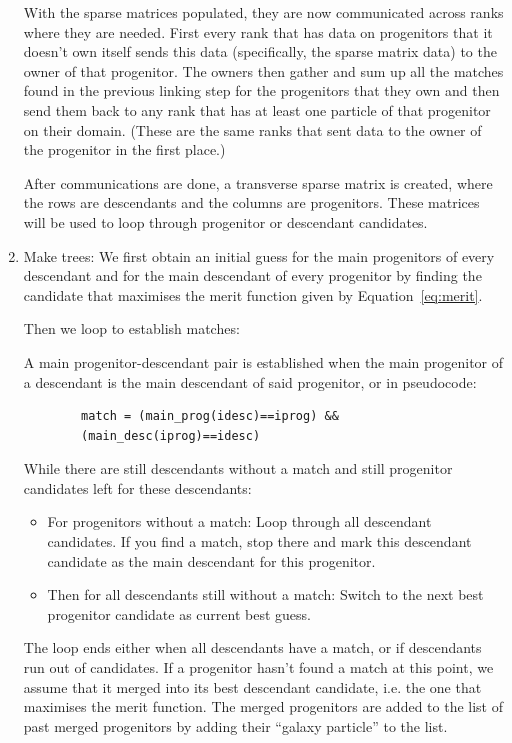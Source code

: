\begin{enumerate}
		With the sparse matrices populated, they are now communicated across ranks where they are needed. 
		First every rank that has data on progenitors that it doesn't own itself sends this data (specifically, the sparse matrix data) to the owner of that progenitor.
		The owners then gather and sum up all the matches found in the previous linking step for the progenitors that they own and then send them 
		back to any rank that has at least one particle of that progenitor on their domain.
		(These are the same ranks that sent data to the owner of the progenitor in the first place.)
		
		After communications are done, a transverse sparse matrix is created, where the rows are descendants and the columns are progenitors.
		These matrices will be used to loop through progenitor or descendant candidates.
		

	
	\item Make trees:
		We first obtain an initial guess for the main progenitors of every descendant and for the main descendant of every progenitor by
		finding the candidate that maximises the merit function given by Equation~\eqref{eq:merit}.
		
		Then we loop to establish matches:
		
		A main progenitor-descendant pair is established when the main progenitor of a descendant is the main descendant of said progenitor, or in pseudocode:
		\begin{verbatim}
		match = (main_prog(idesc)==iprog) && 
        (main_desc(iprog)==idesc)
		\end{verbatim}
		
		While there are still descendants without a match and still progenitor candidates left for these descendants:
		
		\begin{itemize}
			
			\item For progenitors without a match: Loop through all descendant candidates. 
					If you find a match, stop there and mark this descendant candidate as the main descendant for this progenitor.
			
			\item Then for all descendants still without a match: Switch to the next best progenitor candidate as current best guess.
			
		\end{itemize}
		
		The loop ends either when all descendants have a match, or if descendants run out of candidates.
		If a progenitor hasn't found a match at this point, we assume that it merged into its best descendant candidate, i.e. the one that maximises the merit function.
	  The merged progenitors are added to the list of past merged progenitors by adding their ``galaxy particle'' to the list.
		

\end{enumerate}
